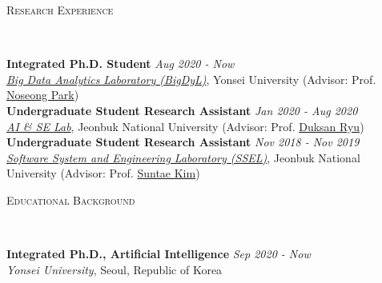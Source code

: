 \documentclass[10pt]{article}
\newenvironment{changemargin}[2]{
  \begin{list}{}{
    \setlength{\topsep}{0pt}
    \setlength{\leftmargin}{#1}
    \setlength{\rightmargin}{#2}
    \setlength{\listparindent}{\parindent}
    \setlength{\itemindent}{\parindent}
    \setlength{\parsep}{\parskip}
  }
  \item[]}{\end{list}
}
\newcommand{\lineover}{
	\begin{changemargin}{-0.05in}{-0.05in}
		\vspace*{-8pt}
		\hrulefill \\
		\vspace*{-2pt}
	\end{changemargin}
}
\newcommand{\header}[1]{
	\begin{changemargin}{-0.5in}{-0.5in}
		\scshape{#1}\\
  	\lineover
	\end{changemargin}
}
\newenvironment{body} {
	\vspace*{-16pt}
	\begin{changemargin}{-0.25in}{-0.5in}
  }
	{\end{changemargin}
}
\begin{document}
\header{Research Experience}
\begin{body}
	\vspace{14pt}
	\textbf{Integrated Ph.D. Student} \hfill \emph{Aug 2020 - Now} \\
	\emph{\href{https://sites.google.com/view/npark}{Big Data Analytics Laboratory (BigDyL)}}, Yonsei University (Advisor: Prof. {\href{https://scholar.google.com/citations?user=VSuM3gYAAAAJ&hl=en}{Noseong Park}})  \\
	\textbf{Undergraduate Student Research Assistant} \hfill \emph{Jan 2020 - Aug 2020} \\
	\emph{\href{https://sites.google.com/view/aiselabjbnu}{AI \& SE Lab}}, Jeonbuk National University (Advisor: Prof. {\href{https://scholar.google.com/citations?user=BHue-MMAAAAJ&hl=en}{Duksan Ryu}})  \\
	\textbf{Undergraduate Student Research Assistant} \hfill \emph{Nov 2018 - Nov 2019} \\
	\emph{\href{https://sites.google.com/view/jbnussel/}{Software System and Engineering Laboratory (SSEL)}}, Jeonbuk National University (Advisor: Prof. {\href{https://scholar.google.com/citations?user=IN_HTKEAAAAJ&hl=en}{Suntae Kim}})  \\
\end{body}
\medskip

\header{Educational Background}

\begin{body}
	\vspace{14pt}
	\textbf{Integrated Ph.D., Artificial Intelligence} \hfill \emph{Sep 2020 -  Now} \\
	\emph{Yonsei University}, Seoul, Republic of Korea \\
\end{body}
\end{document}
